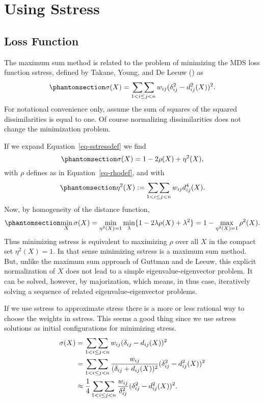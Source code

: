 \documentclass[
  12pt,
  letterpaper,
  DIV=11,
  numbers=noendperiod]{scrartcl}
\newcommand{\sectionbreak}{\clearpage}
\begin{document}
\sectionbreak

\section{Using Sstress}\label{using-sstress}

\subsection{Loss Function}\label{loss-function-1}

The maximum sum method is related to the problem of minimizing the MDS
loss function sstress, defined by Takane, Young, and De Leeuw
() as
\begin{equation}\phantomsection\label{eq-sstressdef}{
\sigma(X)=\mathop{\sum\sum}_{1<i\leq j<n} w_{ij}(\delta_{ij}^2-d_{ij}^2(X))^2.
}\end{equation} For notational convenience only, assume the sum of
squares of the squared dissimilarities is equal to one. Of course
normalizing dissimilarities does not change the minimization problem.

If we expand Equation~\ref{eq-sstressdef} we find
\begin{equation}\phantomsection\label{eq-sstressexp}{
\sigma(X)=1-2\rho(X)+\eta^2(X) ,
}\end{equation} with \(\rho\) defines as in Equation~\ref{eq-rhodef},
and with \begin{equation}\phantomsection\label{eq-stresseta}{
\eta^2(X):=\mathop{\sum\sum}_{1<i\leq j<n} w_{ij}d_{ij}^4(X).
}\end{equation} Now, by homogeneity of the distance function,
\begin{equation}\phantomsection\label{eq-innermin}{
\min_X\sigma(X)=\min_{\eta^2(X)=1}\min_{\lambda}\{1-2\lambda\rho(X)+\lambda^2\}=1-\max_{\eta^2(X)=1}\rho^2(X).
}\end{equation} Thus minimizing sstress is equivalent to maximizing
\(\rho\) over all \(X\) in the compact set \(\eta^2(X)=1\). In that
sense minimizing sstress is a maximum sum method. But, unlike the
maximum sum approach of Guttman and de Leeuw, this explicit
normalization of \(X\) does not lead to a simple eigenvalue-eigenvector
problem. It can be solved, however, by majorization, which means, in
thus case, iteratively solving a sequence of related
eigenvalue-eigenvector problems.

If we use sstress to approximate stress there is a more or less rational
way to choose the weights in sstress. This seems a good thing since we
use sstress solutions as initial configurations for minimizing stress.
\begin{align}
\sigma(X)&=\mathop{\sum\sum}_{1<i\leq j<n}w_{ij}(\delta_{ij}-d_{ij}(X))^2\notag\\
&=\mathop{\sum\sum}_{1<i\leq j<n}\frac{w_{ij}}{(\delta_{ij}+d_{ij}(X))^2}
(\delta_{ij}^2-d_{ij}^2(X))^2\notag\\&\approx\frac14\mathop{\sum\sum}_{1<i\leq j<n} \frac{w_{ij}}{\delta_{ij}^2}
(\delta_{ij}^2-d_{ij}^2(X))^2.
\end{align}
\end{document}
